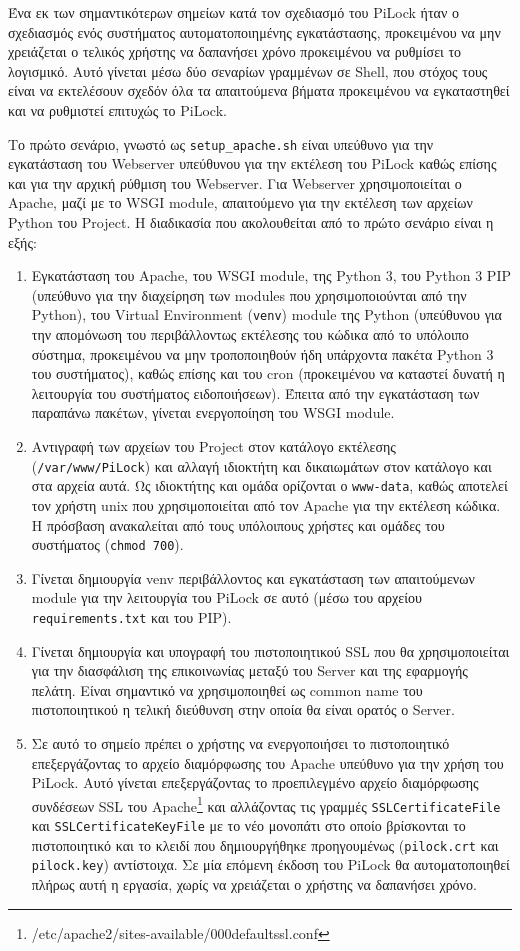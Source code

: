 Ένα εκ των σημαντικότερων σημείων κατά τον σχεδιασμό του PiLock ήταν ο σχεδιασμός ενός συστήματος αυτοματοποιημένης εγκατάστασης, προκειμένου να μην χρειάζεται ο τελικός χρήστης να δαπανήσει χρόνο προκειμένου να ρυθμίσει το λογισμικό. Αυτό γίνεται μέσω δύο σεναρίων γραμμένων σε Shell, που στόχος τους είναι να εκτελέσουν σχεδόν όλα τα απαιτούμενα βήματα προκειμένου να εγκαταστηθεί και να ρυθμιστεί επιτυχώς το PiLock.

Το πρώτο σενάριο, γνωστό ως \verb|setup_apache.sh| είναι υπεύθυνο για την εγκατάσταση του Webserver υπεύθυνου για την εκτέλεση του PiLock καθώς επίσης και για την αρχική ρύθμιση του Webserver. Για Webserver χρησιμοποιείται ο Apache, μαζί με το WSGI module, απαιτούμενο για την εκτέλεση των αρχείων Python του Project. Η διαδικασία που ακολουθείται από το πρώτο σενάριο είναι η εξής:

\begin{enumerate}
	\item Εγκατάσταση του Apache, του WSGI module, της Python 3, του Python 3 PIP (υπεύθυνο για την διαχείρηση των modules που χρησιμοποιούνται από την Python), του Virtual Environment (\verb|venv|) module της Python (υπεύθυνου για την απομόνωση του περιβάλλοντως εκτέλεσης του κώδικα από το υπόλοιπο σύστημα, προκειμένου να μην τροποποιηθούν ήδη υπάρχοντα πακέτα Python 3 του συστήματος), καθώς επίσης και του cron (προκειμένου να καταστεί δυνατή η λειτουργία του συστήματος ειδοποιήσεων). Έπειτα από την εγκατάσταση των παραπάνω πακέτων, γίνεται ενεργοποίηση του WSGI module.
	\item Αντιγραφή των αρχείων του Project στον κατάλογο εκτέλεσης (\verb|/var/www/PiLock|) και αλλαγή ιδιοκτήτη και δικαιωμάτων στον κατάλογο και στα αρχεία αυτά. Ως ιδιοκτήτης και ομάδα ορίζονται ο \verb|www-data|, καθώς αποτελεί τον χρήστη unix που χρησιμοποιείται από τον Apache για την εκτέλεση κώδικα. Η πρόσβαση ανακαλείται από τους υπόλοιπους χρήστες και ομάδες του συστήματος (\verb|chmod 700|).
	\item Γίνεται δημιουργία venv περιβάλλοντος και εγκατάσταση των απαιτούμενων module για την λειτουργία του PiLock σε αυτό (μέσω του αρχείου \verb|requirements.txt| και του PIP).
	\item Γίνεται δημιουργία και υπογραφή του πιστοποιητικού SSL που θα χρησιμοποιείται για την διασφάλιση της επικοινωνίας μεταξύ του Server και της εφαρμογής πελάτη. Είναι σημαντικό να χρησιμοποιηθεί ως common name του πιστοποιητικού η τελική διεύθυνση στην οποία θα είναι ορατός ο Server.
	\item Σε αυτό το σημείο πρέπει ο χρήστης να ενεργοποιήσει το πιστοποιητικό επεξεργάζοντας το αρχείο διαμόρφωσης του Apache υπεύθυνο για την χρήση του PiLock. Αυτό γίνεται επεξεργάζοντας το προεπιλεγμένο αρχείο διαμόρφωσης συνδέσεων SSL του Apache\footnote{/etc/apache2/sites-available/000\-default\-ssl.conf} και αλλάζοντας τις γραμμές \verb|SSLCertificateFile| και \verb|SSLCertificateKeyFile| με το νέο μονοπάτι στο οποίο βρίσκονται το πιστοποιητικό και το κλειδί που δημιουργήθηκε προηγουμένως (\verb|pilock.crt| και \verb|pilock.key|) αντίστοιχα. Σε μία επόμενη έκδοση του PiLock θα αυτοματοποιηθεί πλήρως αυτή η εργασία, χωρίς να χρειάζεται ο χρήστης να δαπανήσει χρόνο.
\end{enumerate}

